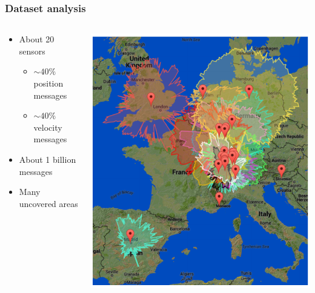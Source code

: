 \documentclass{beamer}
\begin{document}
    \begin{frame}
        \frametitle{Dataset analysis}
        \begin{columns}
            \begin{column}{0.5\textwidth}
                \begin{itemize}
                    \item About 20 sensors
                    \begin{itemize}
                        \item $\sim 40\%$ position messages
                        \item $\sim 40\%$ velocity messages
                    \end{itemize}
                    \item About 1 billion messages
                    \item Many uncovered areas
                \end{itemize}
            \end{column}
            \begin{column}{0.5\textwidth}
                \includegraphics[width=\linewidth]{img/sensors-area}
            \end{column}
        \end{columns}
    \end{frame}
\end{document}
